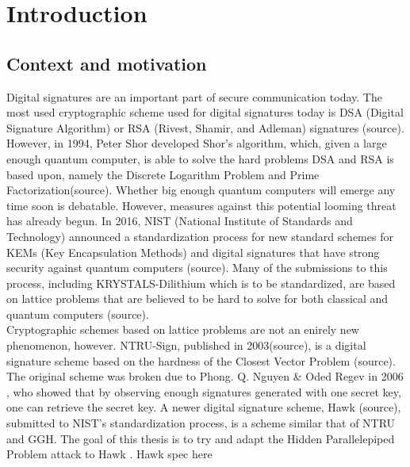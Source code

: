 \chapter{Introduction}
\section{Context and motivation}
Digital signatures are an important part of secure communication today. The most used cryptographic scheme used for digital signatures today is DSA (Digital Signature Algorithm) or RSA (Rivest, Shamir, and Adleman) signatures (source).
However, in 1994, Peter Shor developed Shor's algorithm, which, given a large enough quantum computer, is able to solve the hard problems DSA and RSA is based upon, namely the Discrete Logarithm Problem and Prime Factorization(source). 
Whether big enough quantum computers will emerge any time soon is debatable. However, measures against this potential looming threat has already begun. In 2016, NIST (National Institute of Standards and Technology)
announced a standardization process for new standard schemes for KEMs (Key Encapsulation Methods) and digital signatures that have strong security against quantum computers (source). Many of the submissions to this process,
including KRYSTALS-Dilithium which is to be standardized, are based on lattice problems that are believed to be hard to solve for both classical and quantum computers (source). \hfill \break \\

Cryptographic schemes based on lattice problems are not an enirely new phenomenon, however. NTRU-Sign, published in 2003(source), is a digital signature scheme based on the hardness of the Closest Vector Problem (source).
The original scheme was broken due to Phong. Q. Nguyen \& Oded Regev in 2006 \cite{hpp}, who showed that by observing enough signatures generated with one secret key, one can retrieve the secret key.
A newer digital signature scheme, Hawk (source), submitted to NIST's standardization process, is a scheme similar that of NTRU and GGH. 
The goal of this thesis is to try and adapt the Hidden Parallelepiped Problem attack to Hawk \cite{hawk}. Hawk spec here \cite{hawkspec}
